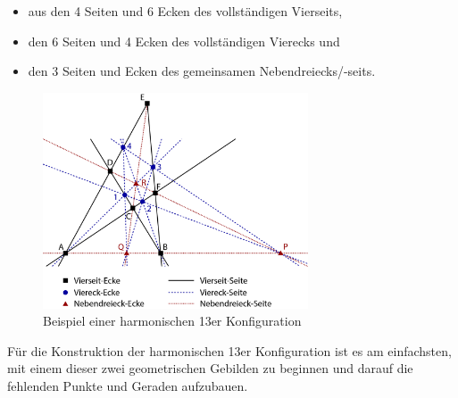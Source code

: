 \documentclass[12pt,a4paper]{article}
\begin{document}
\begin{itemize}
\item[]aus den 4 Seiten und 6 Ecken des vollständigen Vierseits,
\item[]den 6 Seiten und 4 Ecken des vollständigen Vierecks und
\item[]den 3 Seiten und Ecken des gemeinsamen Nebendreiecks/-seits.
\end{itemize}

\begin{figure}[htbp]
\centering
\includegraphics[width=0.7\textwidth]{Bilder/13erKonfigStepbyStep.png}
\caption{Beispiel einer harmonischen 13er Konfiguration}
\label{fig:harmFigur}
\end{figure}

Für die Konstruktion der harmonischen 13er Konfiguration ist es am einfachsten, mit einem dieser zwei geometrischen Gebilden zu beginnen und darauf die fehlenden Punkte und Geraden aufzubauen.
\end{document}
